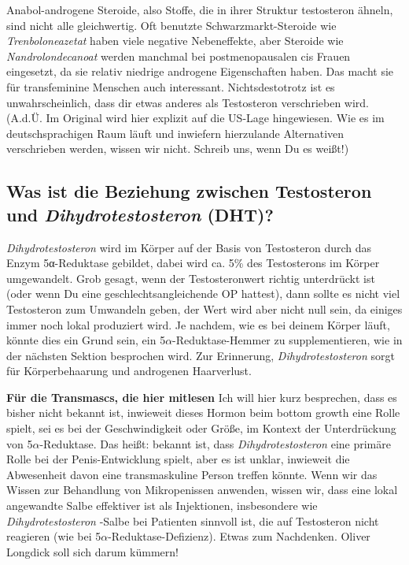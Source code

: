 \documentclass{article}
\begin{document}
{{{Anabol-androgene Steroide, also Stoffe, die in ihrer Struktur testosteron ähneln, sind nicht alle gleichwertig. Oft benutzte Schwarzmarkt-Steroide wie \textit{Trenboloneazetat} haben viele negative Nebeneffekte, aber Steroide wie \textit{Nandrolondecanoat }werden manchmal bei postmenopausalen cis Frauen eingesetzt, da sie relativ niedrige androgene Eigenschaften haben. Das macht sie für transfeminine Menschen auch interessant. Nichtsdestotrotz ist es unwahrscheinlich, dass dir etwas anderes als Testosteron verschrieben wird. (A.d.Ü. Im Original wird hier explizit auf die US-Lage hingewiesen. Wie es im deutschsprachigen Raum läuft und inwiefern hierzulande Alternativen verschrieben werden, wissen wir nicht. Schreib uns, wenn Du es weißt!)

\subsection{Was ist die Beziehung zwischen Testosteron und \textit{Dihydrotestosteron} (DHT)?}

\textit{Dihydrotestosteron} wird im Körper auf der Basis von Testosteron durch das Enzym 5α-Reduktase gebildet, dabei wird ca. 5\% des Testosterons im Körper umgewandelt. Grob gesagt, wenn der Testosteronwert richtig unterdrückt ist (oder wenn Du eine geschlechtsangleichende OP hattest), dann sollte es nicht viel Testosteron zum Umwandeln geben, der Wert wird aber nicht null sein, da einiges immer noch lokal produziert wird. Je nachdem, wie es bei deinem Körper läuft, könnte dies ein Grund sein, ein 5$\alpha$-Reduktase-Hemmer zu supplementieren, wie in der nächsten Sektion besprochen wird. Zur Erinnerung, \textit{Dihydrotestosteron }sorgt für Körperbehaarung und androgenen Haarverlust.

\textbf{Für die Transmascs, die hier mitlesen} Ich will hier kurz besprechen, dass es bisher nicht bekannt ist, inwieweit dieses Hormon beim bottom growth eine Rolle spielt, sei es bei der Geschwindigkeit oder Größe, im Kontext der Unterdrückung von 5$\alpha$-Reduktase. Das heißt: bekannt ist, dass \textit{Dihydrotestosteron }eine primäre Rolle bei der Penis-Entwicklung spielt, aber es ist unklar, inwieweit die Abwesenheit davon eine transmaskuline Person treffen könnte. Wenn wir das Wissen zur Behandlung von Mikropenissen anwenden, wissen wir, dass eine lokal angewandte Salbe effektiver ist als Injektionen, insbesondere wie \textit{Dihydrotestosteron }-Salbe bei Patienten sinnvoll ist, die auf Testosteron nicht reagieren (wie bei 5$\alpha$-Reduktase-Defizienz). Etwas zum Nachdenken. Oliver Longdick soll sich darum kümmern!

}}}
\end{document}
